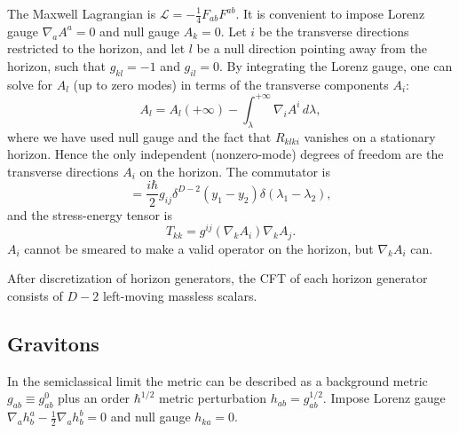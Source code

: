 \documentclass{article}
\begin{document}
The Maxwell Lagrangian is $\mathcal{L} = -\frac{1}{4}F_{ab}F^{ab}$.  It is convenient to impose Lorenz gauge $\nabla_a A^a = 0$ and null gauge $A_k = 0$.  Let $i$ be the transverse directions restricted to the horizon, and let $l$ be a null direction pointing away from the horizon, such that $g_{kl} = -1$ and $g_{il} = 0$.  By integrating the Lorenz gauge, one can solve for $A_l$ (up to zero modes) in terms of the transverse components $A_i$:
\begin{equation}
A_l = A_l(+\infty) -\int^{+\infty}_\lambda \! \nabla_i A^i \,d\lambda,
\end{equation}
where we have used null gauge and the fact that $R_{klki}$ vanishes on a stationary horizon.  Hence the only independent (nonzero-mode) degrees of freedom are the transverse directions $A_i$ on the horizon.  The commutator is
\begin{equation}
[A_i(y_1,\,\lambda_1), \nabla_k A_j(y_2,\,\lambda_2)] =
\frac{i\hbar}{2} g_{ij} \delta^{D-2}(y_1 - y_2) \delta(\lambda_1 - \lambda_2),
\end{equation}
and the stress-energy tensor is
\begin{equation}
T_{kk} = g^{ij} (\nabla_k A_i) \nabla_k A_j.
\end{equation}
$A_i$ cannot be smeared to make a valid operator on the horizon, but $\nabla_k A_i$ can.

After discretization of horizon generators, the CFT of each horizon generator consists of $D - 2$ left-moving massless scalars.

\subsection{Gravitons}\label{grav}

In the semiclassical limit the metric can be described as a background metric
$g_{ab} \equiv g_{ab}^0$ plus an order $\hbar^{1/2}$ metric perturbation $h_{ab} = g_{ab}^{1/2}$.  Impose Lorenz gauge $\nabla_a h^a_b - \frac{1}{2} \nabla_a h^b_b = 0$ and null gauge $h_{ka} = 0$.
\end{document}
